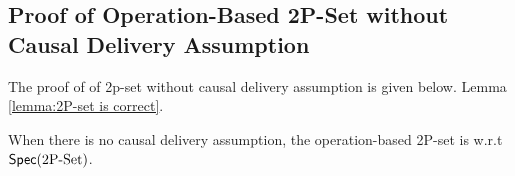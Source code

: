 \subsection{Proof of Operation-Based 2P-Set without Causal Delivery Assumption}
\label{subsec:proof of operation-based 2p-set without causal delivery assumption}

The proof of \crdtlin{} of 2p-set without causal delivery assumption is given below. Lemma \ref{lemma:2P-set is correct}.

\begin{lemma}
\label{lemma:when there is no causal delivery assumption, the operation-based 2p-set is still correct}
When there is no causal delivery assumption, the operation-based 2P-set is \crdtlinearizable{} w.r.t $\mathsf{Spec}(\text{2P\text{-}Set})$.
\end{lemma}

